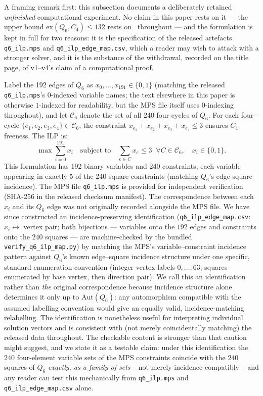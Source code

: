 \documentclass[12pt,a4paper]{article}
\theoremstyle{definition}
\newcommand{\ex}{\mathrm{ex}}
\begin{document}
A framing remark first: this subsection documents a deliberately retained
\emph{unfinished} computational experiment. No claim in this paper rests
on it --- the upper bound $\ex(Q_6,C_4)\le132$ rests on~\cite{HN94}
throughout --- and the formulation is kept in full for two reasons: it is
the specification of the released artefacts \texttt{q6\_ilp.mps} and
\texttt{q6\_ilp\_edge\_map.csv}, which a reader may wish to attack with a
stronger solver, and it is the substance of the withdrawal, recorded on
the title page, of v1--v4's claim of a computational proof.

Label the 192 edges of $Q_6$ as $x_0,\ldots,x_{191}\in\{0,1\}$
(matching the released \texttt{q6\_ilp.mps}'s $0$-indexed variable
names; the text elsewhere in this paper is otherwise $1$-indexed for
readability, but the MPS file itself uses $0$-indexing throughout),
and let $\mathcal{C}_6$ denote the set of all 240 four-cycles of $Q_6$.
For each four-cycle $\{e_1,e_2,e_3,e_4\}\in\mathcal{C}_6$,
the constraint $x_{e_1}+x_{e_2}+x_{e_3}+x_{e_4}\le3$ ensures $C_4$-freeness.
The ILP is:
\[
  \max\sum_{i=0}^{191}x_i \quad\text{subject to}\quad
  \sum_{e\in C}x_e\le3\;\;\forall C\in\mathcal{C}_6,\quad x_i\in\{0,1\}.
\]
This formulation has 192 binary variables and 240 constraints, each
variable appearing in exactly 5 of the 240 square constraints (matching
$Q_6$'s edge-square incidence). The MPS file \texttt{q6\_ilp.mps} is
provided for independent verification (SHA-256 in the released checksum
manifest). The correspondence between each $x_i$ and its $Q_6$ edge was
not originally recorded alongside the MPS file. We have since
constructed an incidence-preserving identification
(\texttt{q6\_ilp\_edge\_map.csv}: $x_i\leftrightarrow$ vertex pair; both
bijections --- variables onto the $192$ edges and constraints onto the
$240$ squares --- are machine-checked by the bundled
\texttt{verify\_q6\_ilp\_map.py}) by matching the MPS's
variable--constraint incidence pattern against $Q_6$'s known
edge--square incidence structure under one specific, standard
enumeration convention (integer vertex labels $0,\ldots,63$; squares
enumerated by base vertex, then direction pair). We call this an
identification rather than \emph{the} original correspondence because
incidence structure alone determines it only up to
$\mathrm{Aut}(Q_6)$: any automorphism compatible with the assumed
labelling convention would give an equally valid, incidence-matching
relabelling. The identification is nonetheless useful for interpreting
individual solution vectors and is consistent with (not merely
coincidentally matching) the released data throughout. The checkable content
is stronger than that caution might suggest, and we state it as a testable
claim: under this identification the $240$ four-element variable sets of the
MPS constraints coincide with the $240$ squares of $Q_6$ \emph{exactly, as a
family of sets} -- not merely incidence-compatibly -- and any reader can test
this mechanically from \texttt{q6\_ilp.mps} and
\texttt{q6\_ilp\_edge\_map.csv} alone.
\end{document}
